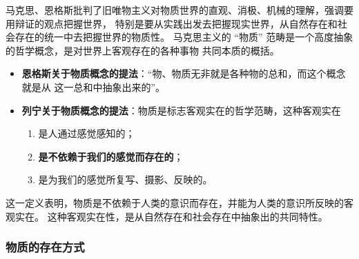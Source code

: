 \documentclass[11pt, UTF8]{book} %
\begin{document}
马克思、恩格斯批判了旧唯物主义对物质世界的直观、消极、机械的理解，强调要用辩证的观点把握世界，
特别是要从实践出发去把握现实世界，从自然存在和社会存在的统一中去把握世界的物质性。
马克思主义的 “物质” 范畴是一个高度抽象的哲学概念，是对世界上客观存在的各种事物
共同本质的概括。
\begin{itemize}[itemsep=0pt]
    \item \textbf{恩格斯关于物质概念的提法}：“物、物质无非就是各种物的总和，而这个概念就是从
    这一总和中抽象出来的”。
    \item \textbf{列宁关于物质概念的提法}：物质是标志客观实在的哲学范畴，这种客观实在
    \begin{enumerate}[label=\textup{\arabic*}${}^\circ$, itemsep=0pt]
        \item 是人通过感觉感知的；
        \item \textbf{是不依赖于我们的感觉而存在的}；
        \item 是为我们的感觉所复写、摄影、反映的。
    \end{enumerate}


\end{itemize}
这一定义表明，物质是不依赖于人类的意识而存在，并能为人类的意识所反映的客观实在。
这种客观实在性，是从自然存在和社会存在中抽象出的共同特性。

\subsubsection{物质的存在方式}
\end{document}
